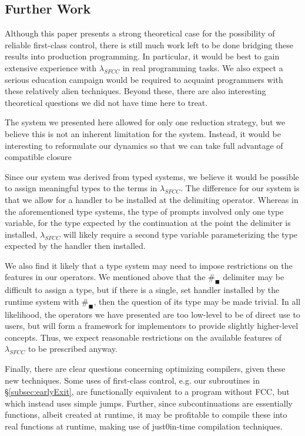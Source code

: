 \documentclass[11pt]{article}
\begin{document}
\subsection{Further Work}

Although this paper presents a strong theoretical case for the possibility of reliable first-class control, there is still much work left to be done bridging these results into production programming.
In particular, it would be best to gain extensive experience with $\lambda_{SFCC}$ in real programming tasks.
We also expect a serious education campaign would be required to acquaint programmers with these relatively alien techniques.
Beyond these, there are also interesting theoretical questions we did not have time here to treat.

The system we presented here allowed for only one reduction strategy, but we believe this is not an inherent limitation for the system.
Instead, it would be interesting to reformulate our dynamics so that we can take full advantage of compatible closure\cite{LambdaWithTypes}

Since our system was derived from typed systems\cite{MFDC}\cite{Gunter:1995}, we believe it would be possible to assign meaningful types to the terms in $\lambda_{SFCC}$.
The difference for our system is that we allow for a handler to be installed at the delimiting operator.
Whereas in the aforementioned type systems, the type of prompts involved only one type variable, for the type expected by the continuation at the point the delimiter is installed, $\lambda_{SFCC}$ will likely require a second type variable parameterizing the type expected by the handler then installed.

We also find it likely that a type system may need to impose restrictions on the features in our operators.
We mentioned above that the $\#_\blacksquare$ delimiter may be difficult to assign a type, but if there is a single, set handler installed by the runtime system with $\#_\blacksquare$, then the question of its type may be made trivial.
In all likelihood, the operators we have presented are too low-level to be of direct use to users, but will form a framework for implementors to provide slightly higher-level concepts.
Thus, we expect reasonable restrictions on the available features of $\lambda_{SFCC}$ to be prescribed anyway.

Finally, there are clear questions concerning optimizing compilers, given these new techniques.
Some uses of first-class control, e.g. our subroutines in \S\ref{subsec:earlyExit}, are functionally equivalent to a program without FCC, but which instead uses simple jumps.
Further, since subcontinuations are essentially functions, albeit created at runtime, it may be profitable to compile these into real functions at runtime, making use of just0in-time compilation techniques.
\end{document}
